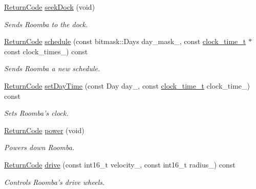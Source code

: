 \begin{DoxyCompactItemize}
\hyperlink{classroomba_1_1series500_1_1_open_interface_a43fc2ae1216e57cfb46901331b9ab4c7}{Return\+Code} \hyperlink{classroomba_1_1series500_1_1_open_interface_a45c9d9d77731030da42f9e3a337c45ed}{seek\+Dock} (void)
\begin{DoxyCompactList}\small\item\em Sends Roomba to the dock. \end{DoxyCompactList}\item 
\hyperlink{classroomba_1_1series500_1_1_open_interface_a43fc2ae1216e57cfb46901331b9ab4c7}{Return\+Code} \hyperlink{classroomba_1_1series500_1_1_open_interface_a9dcca64026dc1a9a563e90f0cfe97396}{schedule} (const bitmask\+::\+Days day\+\_\+mask\+\_\+, const \hyperlink{structroomba_1_1series500_1_1_open_interface_1_1clock__time__t}{clock\+\_\+time\+\_\+t} $\ast$const clock\+\_\+times\+\_\+) const 
\begin{DoxyCompactList}\small\item\em Sends Roomba a new schedule. \end{DoxyCompactList}\item 
\hyperlink{classroomba_1_1series500_1_1_open_interface_a43fc2ae1216e57cfb46901331b9ab4c7}{Return\+Code} \hyperlink{classroomba_1_1series500_1_1_open_interface_a68e09461fd2d7e3fbe20b1e70ea2a3a9}{set\+Day\+Time} (const Day day\+\_\+, const \hyperlink{structroomba_1_1series500_1_1_open_interface_1_1clock__time__t}{clock\+\_\+time\+\_\+t} clock\+\_\+time\+\_\+) const 
\begin{DoxyCompactList}\small\item\em Sets Roomba’s clock. \end{DoxyCompactList}\item 
\hyperlink{classroomba_1_1series500_1_1_open_interface_a43fc2ae1216e57cfb46901331b9ab4c7}{Return\+Code} \hyperlink{classroomba_1_1series500_1_1_open_interface_ae1abe0755730f35dd98d626c48d3f355}{power} (void)
\begin{DoxyCompactList}\small\item\em Powers down Roomba. \end{DoxyCompactList}\item 
\hyperlink{classroomba_1_1series500_1_1_open_interface_a43fc2ae1216e57cfb46901331b9ab4c7}{Return\+Code} \hyperlink{classroomba_1_1series500_1_1_open_interface_a0b02a89315ed3e6daa6b36b5f1327fc7}{drive} (const int16\+\_\+t velocity\+\_\+, const int16\+\_\+t radius\+\_\+) const 
\begin{DoxyCompactList}\small\item\em Controls Roomba’s drive wheels. \end{DoxyCompactList}\item 

\end{DoxyCompactItemize}
